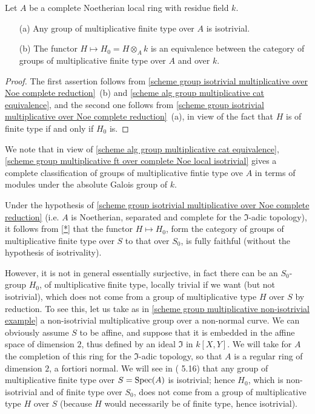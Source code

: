 \begin{corollary}\label{scheme group multiplicative ft over complete Noe local isotrivial}
Let $A$ be a complete Noetherian local ring with residue field $k$.
\begin{enumerate}
    \item[(a)] Any group of multiplicative finite type over $A$ is isotrivial.
    \item[(b)] The functor $H\mapsto H_0=H\otimes_Ak$ is an equivalence between the category of groups of multiplicative finite type over $A$ and over $k$.
\end{enumerate}
\end{corollary}
\begin{proof}
The first assertion follows from \cref{scheme group isotrivial multiplicative over Noe complete reduction}~(b) and \cref{scheme alg group multiplicative cat equivalence}, and the second one follows from \cref{scheme group isotrivial multiplicative over Noe complete reduction}~(a), in view of the fact that $H$ is of finite type if and only if $H_0$ is.
\end{proof}

\begin{remark}
We note that in view of \cref{scheme alg group multiplicative cat equivalence}, \cref{scheme group multiplicative ft over complete Noe local isotrivial} gives a complete classification of groups of multiplicative fintie type ove $A$ in terms of modules under the absolute Galois group of $k$.
\end{remark}

\begin{remark}
Under the hypothesis of \cref{scheme group isotrivial multiplicative over Noe complete reduction} (i.e. $A$ is Noetherian, separated and complete for the $\mathfrak{I}$-adic topology), it follows from \autoref{*} that the functor $H\mapsto H_0$, form the category of groups of multiplicative finite type over $S$ to that over $S_0$, is fully faithful (without the hypothesis of isotrivality).\par
However, it is not in general essentially surjective, in fact there can be an $S_0$-group $H_0$, of multiplicative finite type, locally trivial if we want (but not isotrivial), which does not come from a group of multiplicative type $H$ over $S$ by reduction. To see this, let us take as in \cref{scheme group multiplicative non-isotrivial example} a non-isotrivial multiplicative group over a non-normal curve. We can obviously assume $S$ to be affine, and suppose that it is embedded in the affine space of dimension $2$, thus defined by an ideal $\mathfrak{I}$ in $k[X,Y]$. We will take for $A$ the completion of this ring for the $\mathfrak{I}$-adic topology, so that $A$ is a regular ring of dimension $2$, a fortiori normal. We will see in (\cite{SGA3-2}  5.16) that any group of multiplicative finite type over $S=\mathrm{Spec}(A)$ is isotrivial; hence $H_0$, which is non-isotrivial and of finite type over $S_0$, does not come from a group of multiplicative type $H$ over $S$ (because $H$ would necessarily be of finite type, hence isotrivial).
\end{remark}

